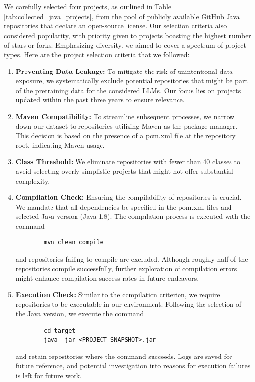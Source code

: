 We carefully selected four projects, as outlined in Table \ref{tab:collected_java_projects}, from the pool of publicly available GitHub Java repositories that declare an open-source license. Our selection criteria also considered popularity, with priority given to projects boasting the highest number of stars or forks. Emphasizing diversity, we aimed to cover a spectrum of project types. Here are the project selection criteria that we followed:\\
    \begin{enumerate}
        \item \textbf{Preventing Data Leakage:} To mitigate the risk of unintentional data exposure, we systematically exclude potential repositories that might be part of the pretraining data for the considered LLMs. Our focus lies on projects updated within the past three years to ensure relevance.
        
        \item \textbf{Maven Compatibility:} To streamline subsequent processes, we narrow down our dataset to repositories utilizing Maven as the package manager. This decision is based on the presence of a pom.xml file at the repository root, indicating Maven usage.

        \item \textbf{Class Threshold:} We eliminate repositories with fewer than 40 classes to avoid selecting overly simplistic projects that might not offer substantial complexity.
        
        \item \textbf{Compilation Check:} Ensuring the compilability of repositories is crucial. We mandate that all dependencies be specified in the pom.xml files and selected Java version (Java 1.8). The compilation process is executed with the command 
        \begin{verbatim}
        mvn clean compile
        \end{verbatim} and repositories failing to compile are excluded. Although roughly half of the repositories compile successfully, further exploration of compilation errors might enhance compilation success rates in future endeavors.
        
        \item \textbf{Execution Check:} Similar to the compilation criterion, we require repositories to be executable in our environment. Following the selection of the Java version, we execute the command 
        \begin{verbatim}
        cd target
        java -jar <PROJECT-SNAPSHOT>.jar
        \end{verbatim}
        and retain repositories where the command succeeds. Logs are saved for future reference, and potential investigation into reasons for execution failures is left for future work.
    \end{enumerate}

